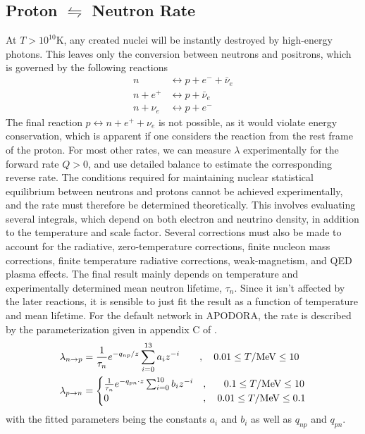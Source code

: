 \subsection[Proton to neutron rate]{Proton $\leftrightharpoons$ Neutron Rate}
At $T>10^{10}$K, any created nuclei will be instantly destroyed by high-energy photons. This leaves only the conversion between neutrons and positrons, which is governed by the following reactions
\begin{align}
    n &\leftrightarrow p+e^-+\bar{\nu}_e\label{eq:np1}\\
    n+e^+ &\leftrightarrow p+\bar{\nu}_e\label{eq:np2}\\
    n+\nu_e &\leftrightarrow p+e^-
    \label{eq:np3}
\end{align}
The final reaction $p\leftrightarrow n+e^++\nu_e$ is not possible, as it would violate energy conservation, which is apparent if one considers the reaction from the rest frame of the proton. For most other rates, we can measure $\lambda$ experimentally for the forward rate $Q>0$, and use detailed balance to estimate the corresponding reverse rate. The conditions required for maintaining nuclear statistical equilibrium between neutrons and protons cannot be achieved experimentally, and the rate must therefore be determined theoretically. This involves evaluating several integrals, which depend on both electron and neutrino density, in addition to the temperature and scale factor. Several corrections must also be made to account for the radiative, zero-temperature corrections, finite nucleon mass corrections, finite temperature radiative corrections, weak-magnetism, and QED plasma effects\cite{PRIMAT}. 
The final result mainly depends on temperature and experimentally determined mean neutron lifetime, $\tau_n$. Since it isn't affected by the later reactions, it is sensible to just fit the result as a function of temperature and mean lifetime. 
For the default network in APODORA, the rate is described by the parameterization given in appendix C of \textcite{Serpico_2004}.
\begin{align}
    \lambda_{n\rightarrow p}&=\frac{1}{\tau_n}e^{-q_{np}/z}\sum_{i=0}^{13}a_i z^{-i}\quad\quad , \quad 0.01\leq T/\text{MeV} \leq 10 \\
    \lambda_{p\rightarrow n}&=
\begin{cases}
    \frac{1}{\tau_n}e^{-q_{pn}\cdot z}\sum_{i=0}^{10}b_i z^{-i}&,\quad\ \ 0.1\leq T/\text{MeV} \leq 10\\
        0&,\quad 0.01\leq T/\text{MeV} \leq 0.1
\end{cases}
\end{align}
with the fitted parameters being the constants $a_i$ and $b_i$ as well as $q_{np}$ and $q_{pn}$. 

